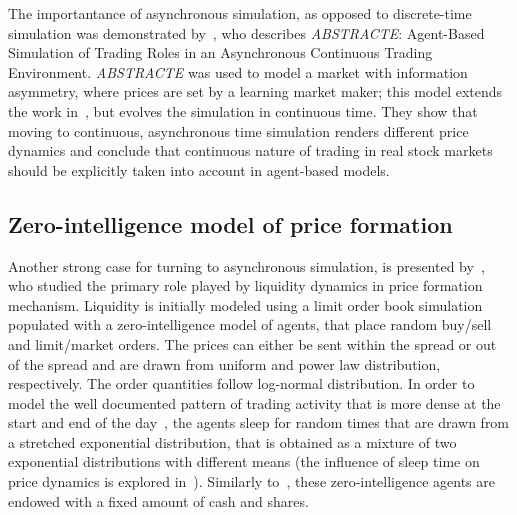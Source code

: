 The importantance of asynchronous simulation, as opposed to discrete-time simulation was demonstrated by~\citet{Sorban2008}, who describes \textit{ABSTRACTE}: Agent-Based Simulation of Trading Roles in an Asynchronous Continuous Trading Environment. \textit{ABSTRACTE} was used to model a market with information asymmetry, where prices are set by a learning market maker; this model extends the work in~\citep{Das2006}, but evolves the simulation in continuous time. They show that moving to continuous, asynchronous time simulation renders different price dynamics and conclude that continuous nature of trading in real stock markets should be explicitly taken into account in agent-based models.

\subsection{Zero-intelligence model of price formation}

Another strong case for turning to asynchronous simulation, is presented by~\citet{Gilles2006}, who studied the primary role played by liquidity dynamics in price formation mechanism. Liquidity is initially modeled using a limit order book simulation populated with a zero-intelligence model of agents, that place random buy/sell and limit/market orders. The prices can either be sent within the spread or out of the spread and are drawn from uniform and power law distribution, respectively. The order quantities follow log-normal distribution. In order to model the well documented pattern of trading activity that is more dense at the start and end of the day~\cite{Clark1973}, the agents sleep for random times that are drawn from a stretched exponential distribution, that is obtained as a mixture of two exponential distributions with different means (the influence of sleep time on price dynamics is explored in~\cite{Scalas2004}). Similarly to~\cite{Raberto2001}, these zero-intelligence agents are endowed with a fixed amount of cash and shares.






   







